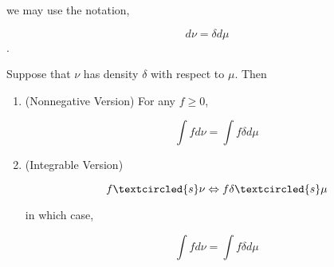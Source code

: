 \documentclass[11pt,fleqn]{book} %
\begin{document}
we may use the notation, 

		$$d \nu = \delta d\mu $$. 

\begin{theorem}
	Suppose that $\nu$ has density $\delta$ with respect to $\mu$. Then

		\begin{enumerate}
			\item (Nonnegative Version) For any $f \geq 0$, 

					$$\int f d\nu = \int f \delta d\mu $$

			\item (Integrable Version) 

					$$f \textcircled{s} \nu \Leftrightarrow f \delta \textcircled{s} \mu $$

			in which case, 

					$$\int f d\nu = \int f \delta d\mu $$
		\end{enumerate}
\end{theorem}
\end{document}

